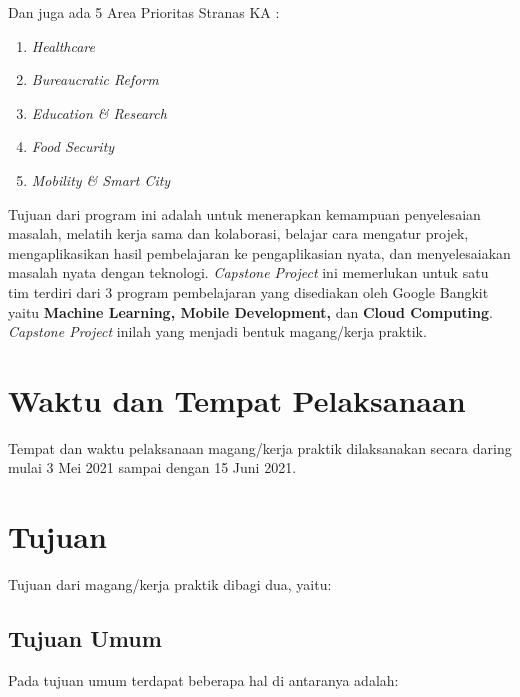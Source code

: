 Dan juga ada 5 Area Prioritas Stranas KA \cite{stranas}:

\begin{enumerate}[nolistsep]

  \item \textit{Healthcare}

  \item \textit{Bureaucratic Reform}

  \item \textit{Education \& Research}

  \item \textit{Food Security}

  \item \textit{Mobility \& Smart City}

\end{enumerate}
Tujuan dari program ini adalah untuk menerapkan kemampuan penyelesaian masalah, melatih kerja sama dan kolaborasi, belajar cara mengatur projek, mengaplikasikan hasil pembelajaran ke pengaplikasian nyata, dan menyelesaiakan masalah nyata dengan teknologi.
\textit{Capstone Project} ini memerlukan untuk satu tim terdiri dari 3 program pembelajaran yang disediakan oleh Google Bangkit yaitu \textbf{Machine Learning, Mobile Development,} dan \textbf{Cloud Computing}.
\textit{Capstone Project} inilah yang menjadi bentuk magang/kerja praktik.

\section{Waktu dan Tempat Pelaksanaan}

Tempat dan waktu pelaksanaan magang/kerja praktik dilaksanakan secara daring mulai 3 Mei 2021 sampai dengan 15 Juni 2021.

\section{Tujuan}

Tujuan dari magang/kerja praktik dibagi dua, yaitu:

  \subsection{Tujuan Umum}
  Pada tujuan umum terdapat beberapa hal di antaranya adalah:
  
